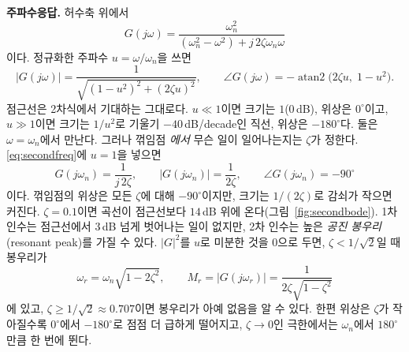 \documentclass[11pt]{article}
\begin{document}
\smallskip\noindent\textbf{주파수응답.} 허수축 위에서
\begin{equation}\label{eq:secondfreq}
   G(j\omega) = \frac{\omega_n^{2}}{(\omega_n^{2}-\omega^{2})+j\,2\zeta\omega_n\omega}
\end{equation}
이다. 정규화한 주파수 $u=\omega/\omega_n$을 쓰면
\[
   |G(j\omega)| = \frac{1}{\sqrt{(1-u^{2})^{2}+(2\zeta u)^{2}}},
   \qquad
   \angle G(j\omega) = -\operatorname{atan2}\bigl(2\zeta u,\;1-u^{2}\bigr).
\]
점근선은 2차식에서 기대하는 그대로다. $u\ll1$이면 크기는 $1$(0\,dB), 위상은
$0^\circ$이고, $u\gg1$이면 크기는 $1/u^{2}$로 기울기 $-40$\,dB/decade인 직선,
위상은 $-180^\circ$다. 둘은 $\omega=\omega_n$에서 만난다. 그러나 꺾임점
\emph{에서} 무슨 일이 일어나는지는 $\zeta$가 정한다. \eqref{eq:secondfreq}에
$u=1$을 넣으면
\[
   G(j\omega_n) = \frac{1}{j\,2\zeta},
   \qquad
   |G(j\omega_n)| = \frac{1}{2\zeta},
   \qquad
   \angle G(j\omega_n) = -90^\circ
\]
이다. 꺾임점의 위상은 모든 $\zeta$에 대해 $-90^\circ$이지만, 크기는
$1/(2\zeta)$로 감쇠가 작으면 커진다. $\zeta=0.1$이면 곡선이 점근선보다 $14$\,dB
위에 온다(그림~\ref{fig:secondbode}). 1차 인수는 점근선에서 $3$\,dB 넘게 벗어나는
일이 없지만, 2차 인수는 높은 \emph{공진 봉우리}(resonant peak)를 가질 수 있다.
$|G|^{2}$를 $u$로 미분한 것을 0으로 두면, $\zeta<1/\sqrt2$일 때 봉우리가
\begin{equation}\label{eq:resonance}
   \omega_r = \omega_n\sqrt{1-2\zeta^{2}},
   \qquad
   M_r = |G(j\omega_r)| = \frac{1}{2\zeta\sqrt{1-\zeta^{2}}}
\end{equation}
에 있고, $\zeta\ge1/\sqrt2\approx0.707$이면 봉우리가 아예 없음을 알 수 있다. 한편
위상은 $\zeta$가 작아질수록 $0^\circ$에서 $-180^\circ$로 점점 더 급하게 떨어지고,
$\zeta\to0$인 극한에서는 $\omega_n$에서 $180^\circ$만큼 한 번에 뛴다.
\end{document}

